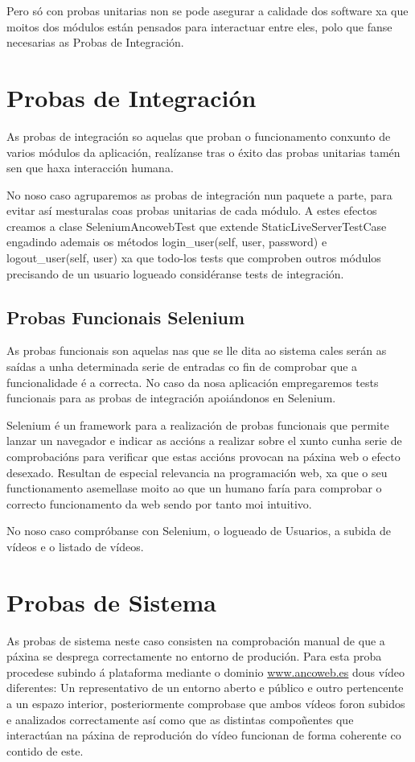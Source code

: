         Pero só con probas unitarias non se pode asegurar a calidade dos software xa que moitos dos
        módulos están pensados para interactuar entre eles, polo que fanse necesarias as Probas de
        Integración.

\section{Probas de Integración}

    As probas de integración so aquelas que proban o funcionamento conxunto de varios módulos da 
    aplicación, realízanse tras o éxito das probas unitarias tamén sen que haxa interacción humana.
    
    No noso caso agruparemos as probas de integración nun paquete a parte, para evitar así 
    mesturalas coas probas unitarias de cada módulo. A estes efectos creamos a clase SeleniumAncowebTest
    que extende StaticLiveServerTestCase engadindo ademais os métodos login\_user(self, user, 
    password) e logout\_user(self, user) xa que todo-los tests que comproben outros módulos precisando
    de un usuario logueado considéranse tests de integración.

    \subsection{Probas Funcionais Selenium}

        As probas funcionais son aquelas nas que se lle dita ao sistema cales serán as saídas a unha 
        determinada serie de entradas co fin de comprobar que a funcionalidade é a correcta. No caso da
        nosa aplicación empregaremos tests funcionais para as probas de integración apoiándonos en Selenium.
        
        Selenium é un framework para a realización de probas funcionais que permite lanzar un navegador
        e indicar as accións a realizar sobre el xunto cunha serie de comprobacións para verificar que
        estas accións provocan na páxina web o efecto desexado. Resultan de especial relevancia na 
        programación web, xa que o seu functionamento asemellase moito ao que un humano faría para 
        comprobar o correcto funcionamento da web sendo por tanto moi intuitivo.
        
        No noso caso compróbanse con Selenium, o logueado de Usuarios, a subida de vídeos e o listado de
        vídeos.
    
\section{Probas de Sistema}
    As probas de sistema neste caso consisten na comprobación manual de que a páxina se desprega 
    correctamente no entorno de produción. Para esta proba procedese subindo á plataforma mediante 
    o dominio \url{www.ancoweb.es} dous vídeo diferentes: Un representativo de un entorno aberto e público
    e outro pertencente a un espazo interior, posteriormente comprobase que ambos vídeos foron
    subidos e analizados correctamente así como que as distintas compoñentes que interactúan na 
    páxina de reprodución do vídeo funcionan de forma coherente co contido de este. 

